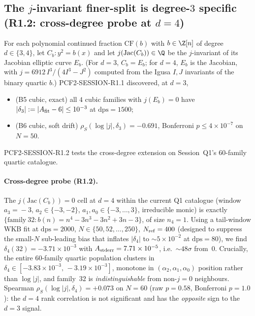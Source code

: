 
\subsection*{The $j$-invariant finer-split is degree-$3$ specific
            (R1.2: cross-degree probe at $d=4$)}

For each polynomial continued fraction $\mathrm{CF}(b)$ with $b\in\Z[n]$
of degree $d\in\{3,4\}$, let $C_b\colon y^2=b(x)$ and let
$j(\mathrm{Jac}(C_b))\in\Q$ be the $j$-invariant of its Jacobian elliptic
curve $E_b$. (For $d=3$, $C_b=E_b$; for $d=4$, $E_b$ is the Jacobian, with
$j=6912\,I^{3}/(4 I^{3}-J^{2})$ computed from the Igusa $I,J$ invariants
of the binary quartic $b$.) PCF2-SESSION-R1.1 discovered, at $d=3$,
\begin{itemize}
  \item (B5 cubic, exact) all $4$ cubic families with $j(E_b)=0$ have
        $|\delta_3| := |A_{\rm fit}-6| \le 10^{-3}$ at $\mathrm{dps}=1500$;
  \item (B6 cubic, soft drift) $\rho_S(\log|j|,\delta_3)=-0.691$,
        Bonferroni $p\le 4\times 10^{-7}$ on $N=50$.
\end{itemize}
PCF2-SESSION-R1.2 tests the cross-degree extension on Session~Q1's
$60$-family quartic catalogue.

\paragraph{Cross-degree probe (R1.2).}
The $j(\mathrm{Jac}(C_b))=0$ cell at $d=4$ within the current Q1
catalogue (window $a_3\!=\!-3$, $a_2\in\{-3,-2\}$,
$a_1,a_0\in\{-3,\ldots,3\}$, irreducible monic) is exactly
$\{\mathrm{family}~32\colon b(n)=n^4-3n^3-3n^2+3n-3\}$, of size $n_4=1$.
Using a tail-window WKB fit at $\mathrm{dps}=2000$, $N\in\{50,52,\ldots,250\}$,
$N_{\rm ref}=400$ (designed to suppress the small-$N$ sub-leading bias that
inflates $|\delta_4|$ to $\sim 5\times 10^{-2}$ at $\mathrm{dps}=80$), we
find $\delta_4(32) = -3.71\times 10^{-3}$ with
$A_{\rm stderr}=7.71\times 10^{-5}$, i.e.\ $\sim 48\sigma$ from~$0$.
Crucially, the entire $60$-family quartic population clusters in
$\delta_4\in[-3.83\times 10^{-3},\,-3.19\times 10^{-3}]$, monotone in
$(\alpha_2,\alpha_1,\alpha_0)$ position rather than $\log|j|$, and
family~$32$ is \emph{indistinguishable} from non-$j=0$ neighbours.
Spearman $\rho_S(\log|j|,\delta_4) = +0.073$ on $N=60$
(raw $p=0.58$, Bonferroni $p=1.0$): the $d=4$ rank correlation is not
significant and has the \emph{opposite} sign to the $d=3$ signal.

